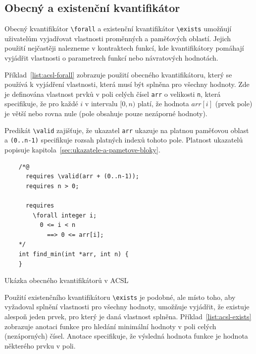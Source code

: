 \subsection{Obecný a existenční kvantifikátor}
\label{subsec:anotace-kvantifikatory}


Obecný kvantifikátor \texttt{\textbackslash forall} a existenční kvantifikátor \texttt{\textbackslash exists}
umožňují uživatelům vyjadřovat vlastnosti proměnných a paměťových oblastí.
Jejich použití nejčastěji nalezneme v kontraktech funkcí,
kde kvantifikátory pomáhají vyjádřit vlastnosti o parametrech funkcí nebo návratových hodnotách.


Příklad~\ref{list:acsl-forall} zobrazuje použití obecného kvantifikátoru,
který se používá k vyjádření vlastnosti, která musí být splněna pro všechny hodnoty.
Zde je definována vlastnost prvků v poli celých čísel \texttt{arr} o velikosti \texttt{n},
která specifikuje, že pro každé $i$ v intervalu $[0, n)$ platí,
že hodnota $arr[i]$ (prvek pole) je větší nebo rovna nule (pole obsahuje pouze nezáporné hodnoty).

Predikát \texttt{\textbackslash valid} zajišťuje,
že ukazatel \texttt{arr} ukazuje na platnou paměťovou oblast
a \texttt{(0..n-1)} specifikuje rozsah platných indexů tohoto pole.
Platnost ukazatelů popisuje kapitola~\ref{sec:ukazatele-a-pametove-bloky}.

\begin{listing}[H]
    \begin{verbatim}
    /*@
      requires \valid(arr + (0..n-1));
      requires n > 0;

      requires
        \forall integer i;
          0 <= i < n
            ==> 0 <= arr[i];
    */
    int find_min(int *arr, int n) {
    }
    \end{verbatim}
    \caption{Ukázka obecného kvantifikátorů v ACSL}
    \label{list:acsl-forall}
\end{listing}


Použití existenčního kvantifikátoru \texttt{\textbackslash exists} je podobné,
ale místo toho, aby vyžadoval splnění vlastnosti pro všechny hodnoty,
umožňuje vyjádřit, že existuje alespoň jeden prvek, pro který je daná vlastnost splněna.
Příklad~\ref{list:acsl-exists} zobrazuje anotaci funkce pro hledání minimální hodnoty v poli celých (nezáporných) čísel.
Anotace specifikuje, že výsledná hodnota funkce je hodnota některého prvku v poli.

